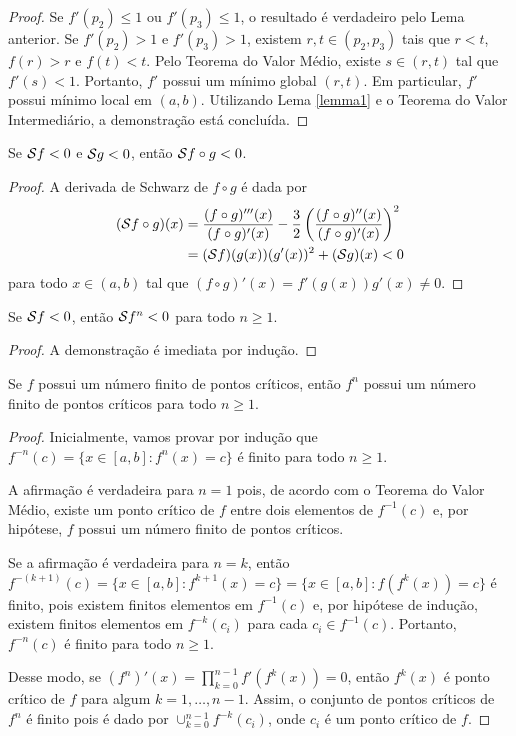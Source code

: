 \begin{proof}
Se $f'(p_2) \leq 1$ ou $f'(p_3) \leq 1$, o resultado é verdadeiro pelo Lema anterior. Se $f'(p_2) > 1$ e $f'(p_3) > 1$, existem $r, t \in (p_2,p_3)$ tais que $r<t$, $f(r) > r$ e $f(t) < t$. Pelo Teorema do Valor Médio, existe $s \in (r,t)$ tal que $f'(s) < 1$. Portanto, $f'$ possui um mínimo global $(r,t)$. Em particular, $f'$ possui mínimo local em $(a,b)$. Utilizando Lema \ref{lemma1} e o Teorema do Valor Intermediário, a demonstração está concluída.
\end{proof}

\begin{lemma}
Se $\mathcal{S} f < 0$ e $\mathcal{S} g < 0$, então $\mathcal{S} f \circ g < 0$.
\end{lemma}

\begin{proof}
A derivada de Schwarz de $f \circ g$ é dada por
\begin{align*}
(\mathcal{S} f \circ g)(x) & = \frac{(f \circ g)'''(x)}{(f \circ g)'(x)} - \frac{3}{2} \left( \frac{(f \circ g)''(x)}{(f \circ g)'(x)} \right)^2 \\
& = (\mathcal{S} f)(g(x)) (g'(x))^2 + (\mathcal{S} g)(x) < 0
\end{align*}
para todo $x \in (a,b)$ tal que $(f \circ g)'(x) = f'(g(x))g'(x) \neq 0$.
\end{proof}

\begin{corollary}
Se  $\mathcal{S} f < 0$, então $\mathcal{S} f^n < 0$ para todo $n \geq 1$.
\end{corollary}

\begin{proof}
A demonstração é imediata por indução.
\end{proof}

\begin{lemma}
Se $f$ possui um número finito de pontos críticos, então $f^n$ possui um número finito de pontos críticos para todo $n \geq 1$.
\end{lemma}
\begin{proof}
Inicialmente, vamos provar por indução que $f^{-n}(c) = \{ x \in [a,b] : f^n(x) = c \}$ é finito para todo $n \geq 1$.

A afirmação é verdadeira para $n = 1$ pois, de acordo com o Teorema do Valor Médio, existe um ponto crítico de $f$ entre dois elementos de $f^{-1}(c)$ e, por hipótese, $f$ possui um número finito de pontos críticos.

Se a afirmação é verdadeira para $n = k$, então $f^{-(k+1)}(c) = \{ x \in [a,b] : f^{k+1}(x) = c \} = \{ x \in [a,b] : f(f^k(x)) = c \}$ é finito, pois existem finitos elementos em $f^{-1}(c)$ e, por hipótese de indução, existem finitos elementos em $f^{-k}(c_ i)$ para cada $c_i \in f^{-1}(c)$. Portanto, $f^{-n}(c)$ é finito para todo $n \geq 1$.

Desse modo, se $(f^n)'(x) = \prod_{k=0}^{n-1} f'(f^k(x)) = 0$, então $f^k(x)$ é ponto crítico de $f$ para algum $k = 1, \dots, n-1$. Assim, o conjunto de pontos críticos de $f^n$ é finito pois é dado por $\cup_{k=0}^{n-1} f^{-k}(c_i)$, onde $c_i$ é um ponto crítico de $f$.
\end{proof}

